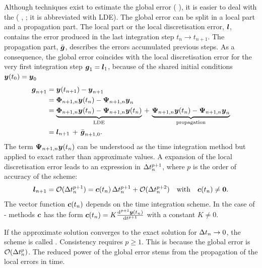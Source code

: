 Although techniques exist to estimate the global
error ( \etal{} \cite{hairer87, hairer91}), it is easier to deal
with 
the  (\cf{}  \etal{}
\cite{hairer87},  \etal{} \cite{deuflhard94}; it is
abbreviated with LDE)\@.  
The global error can be split in a local part and a propagation
part. The local part or the local discretisation error, $\boldsymbol{l}$, 
contains the 
error produced in the last integration step $t_n \to t_{n+1}$\@. The
propagation part, $\bar{\boldsymbol{g}}$, describes the errors accumulated
previous steps. As a consequence, the global error coincides with the
local discretisation error for the very first integration step
$\boldsymbol{g}_1 = \boldsymbol{l}_1$, because of the shared initial conditions
$\boldsymbol{y}(t_0) = \boldsymbol{y}_0$
\begin{equation}\label{eq:adap:ge-lde-prop}
\begin{split}
  \boldsymbol{g}_{n+1}
  & = \boldsymbol{y}(t_{n+1}) - \boldsymbol{y}_{n+1}
\\
  & = \boldsymbol{\Phi}_{n+1,n} \boldsymbol{y}(t_n) - \boldsymbol{\Psi}_{n+1,n} \boldsymbol{y}_n
\\
  & = \underbrace{\boldsymbol{\Phi}_{n+1,n} \boldsymbol{y}(t_n) -
  \boldsymbol{\Psi}_{n+1,n} \boldsymbol{y}(t_n)}_{\text{LDE}}
  \,+\, \underbrace{\boldsymbol{\Psi}_{n+1,n} \boldsymbol{y}(t_n) -
  \boldsymbol{\Psi}_{n+1,n} \boldsymbol{y}_n}_{\text{propagation}}
\\
  & = \boldsymbol{l}_{n+1} \,+\, \bar{\boldsymbol{g}}_{n+1,0}
  \text{.}
\end{split}
\end{equation}
The term $\boldsymbol{\Psi}_{n+1,n} \boldsymbol{y}(t_n)$ can be understood as the
time integration method but applied to exact rather than
approximate values. A  expansion of the local discretisation error leads to an
expression 
in $\Delta t_n^{p+1}$, where $p$ is the order of accuracy of the scheme:
\begin{equation} \label{eq:adap:lde}
  \boldsymbol{l}_{n+1} 
  = \mathcal{O}(\Delta t_n^{p+1})
  = \boldsymbol{c}(t_n)\, \Delta t_n^{p+1} + \mathcal{O}(\Delta t_n^{p+2})
  \quad\text{with}\quad
  \boldsymbol{c}(t_n) \neq \boldsymbol{0}
  \text{.}
\end{equation}
The vector function $\boldsymbol{c}(t_n)$ depends on the time
integration scheme. In the case of - methods $\boldsymbol{c}$ has
the form $\boldsymbol{c}(t_n) = K \frac{\mathrm{d}^{p+1} \boldsymbol{y}(t_n)}{\mathrm{d}
  t^{p+1}}$ with a constant $K \neq 0$\@.

If the approximate solution converges
to the exact solution for $\Delta t_n\to0$, the scheme is called
\@. Consistency requires $p\geq1$\@. This is because the
global error is $\mathcal{O}(\Delta t_n^p)$\@. The reduced 
power of the global error stems from the propagation of the local
errors in time. 

